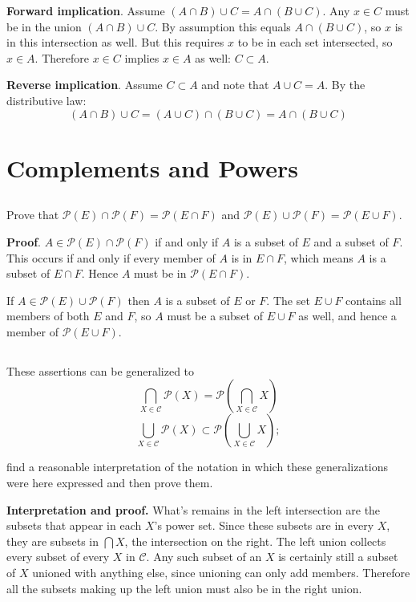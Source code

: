 \documentclass{article}
\begin{document}
\textbf{Forward implication}. Assume $(A \cap B) \cup C = A \cap (B \cup C)$. Any $x \in C$ must be in the union $(A \cap B) \cup C$. By assumption this equals $A \cap (B \cup C)$, so $x$ is in this intersection as well. But this requires $x$ to be in each set intersected, so $x \in A$. Therefore $x \in C$ implies $x \in A$ as well: $C \subset A$.

\textbf{Reverse implication}. Assume $C \subset A$ and note that $A \cup C = A$. By the distributive law:
$$(A \cap B) \cup C = (A \cup C) \cap (B \cup C) = A \cap (B \cup C)$$

\section{Complements and Powers}

\subsection{} Prove that $\mathscr{P}(E) \cap \mathscr{P}(F) = \mathscr{P}(E \cap F)$ and $\mathscr{P}(E) \cup \mathscr{P}(F) = \mathscr{P}(E \cup F)$.

\textbf{Proof}. $A \in \mathscr{P}(E) \cap \mathscr{P}(F)$ if and only if $A$ is a subset of $E$ and a subset of $F$. This occurs if and only if every member of $A$ is in $E \cap F$, which means $A$ is a subset of $E \cap F$. Hence $A$ must be in $\mathscr{P}(E \cap F)$.

If $A \in \mathscr{P}(E) \cup \mathscr{P}(F)$ then $A$ is a subset of $E$ or $F$. The set $E \cup F$ contains all members of both $E$ and $F$, so $A$ must be a subset of $E \cup F$ as well, and hence a member of $\mathscr{P}(E \cup F)$. 

\subsection{} These assertions can be generalized to 
$$ \bigcap_{X \in \mathcal{C}} \mathscr{P}(X) = \mathscr{P}\left(\bigcap_{X \in \mathcal{C}} X\right)$$
$$ \bigcup_{X \in \mathcal{C}} \mathscr{P}(X) \subset \mathscr{P}\left(\bigcup_{X \in \mathcal{C}} X\right);$$

find a reasonable interpretation of the notation in which these generalizations were here expressed and then prove them.

\textbf{Interpretation and proof.} What's remains in the left intersection are the subsets that appear in each $X$'s power set. Since these subsets are in every $X$, they are subsets in $\bigcap X$, the intersection on the right. The left union collects every subset of every $X$ in $\mathcal{C}$. Any such subset of an $X$ is certainly still a subset of $X$ unioned with anything else, since unioning can only add members. Therefore all the subsets making up the left union must also be in the right union.
\end{document}
